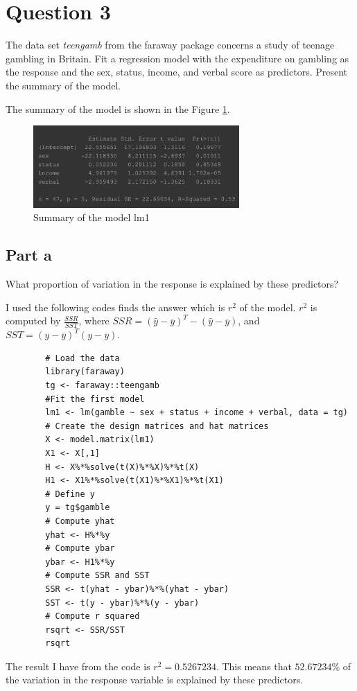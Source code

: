 \section{Question 3}

\begin{question}
    The data set \textit{teengamb} from the faraway package concerns a study of teenage gambling in Britain. Fit a regression model with the expenditure on gambling as the response and the sex, status, income, and verbal score as predictors. Present the summary of the model.
\end{question}

\begin{answer}
    The summary of the model is shown in the Figure \ref{fig:fig9}.
    \begin{figure}[H]
        \centering
        \includegraphics[width=0.7\textwidth]{Figure 9.jpeg}
        \caption{\label{fig:fig9}Summary of the model lm1}
    \end{figure}
\end{answer}

\subsection{Part a}

\begin{question}
    What proportion of variation in the response is explained by these predictors?
\end{question}

\begin{answer}
    I used the following codes finds the answer which is $r^2$ of the model. $r^2$ is computed by $\tfrac{SSR}{SST}$, where $SSR = {(\hat{y} - \overline{y})}^T - (\hat{y} - \overline{y})$, and $SST = {(y - \overline{y})}^T(y - \overline{y})$. 
    \begin{verbatim}
        # Load the data
        library(faraway)
        tg <- faraway::teengamb
        #Fit the first model
        lm1 <- lm(gamble ~ sex + status + income + verbal, data = tg)
        # Create the design matrices and hat matrices
        X <- model.matrix(lm1)
        X1 <- X[,1]
        H <- X%*%solve(t(X)%*%X)%*%t(X)
        H1 <- X1%*%solve(t(X1)%*%X1)%*%t(X1) 
        # Define y
        y = tg$gamble
        # Compute yhat
        yhat <- H%*%y 
        # Compute ybar
        ybar <- H1%*%y
        # Compute SSR and SST
        SSR <- t(yhat - ybar)%*%(yhat - ybar)
        SST <- t(y - ybar)%*%(y - ybar)
        # Compute r squared
        rsqrt <- SSR/SST
        rsqrt
    \end{verbatim}
    The result I have from the code is $r^2 = 0.5267234$. This means that $52.67234\%$ of the variation in the response variable is explained by these predictors.
\end{answer}


